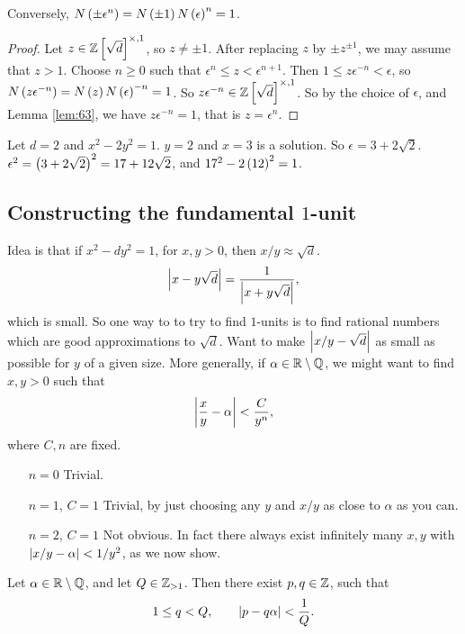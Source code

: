 Conversely, $ N\left( \pm \epsilon^n \right) = N\left( \pm 1 \right)N\left( \epsilon \right)^n = 1 $.

\begin{proof}
Let $ z \in \mathbb{Z}\left[ \sqrt{d} \right]^{\times, 1} $, so $ z \ne \pm 1 $. After replacing $ z $ by $ \pm z^{\pm 1} $, we may assume that $ z > 1 $. Choose $ n \ge 0 $ such that $ \epsilon^n \le z < \epsilon^{n + 1} $. Then $ 1 \le z\epsilon^{-n} < \epsilon $, so $ N\left( z\epsilon^{-n} \right) = N\left( z \right)N\left( \epsilon \right)^{-n} = 1 $. So $ z\epsilon^{-n} \in \mathbb{Z}\left[ \sqrt{d} \right]^{\times, 1} $. So by the choice of $ \epsilon $, and Lemma \ref{lem:63}, we have $ z\epsilon^{-n} = 1 $, that is $ z = \epsilon^n $.
\end{proof}

\begin{example*}
Let $ d = 2 $ and $ x^2 - 2y^2 = 1 $. $ y = 2 $ and $ x = 3 $ is a solution. So $ \epsilon = 3 + 2\sqrt{2} $. $ \epsilon^2 = \left( 3 + 2\sqrt{2} \right)^2 = 17 + 12\sqrt{2} $, and $ 17^2 - 2\left( 12 \right)^2  = 1 $.
\end{example*}

\subsection{Constructing the fundamental $ 1 $-unit}

Idea is that if $ x^2 - dy^2 = 1 $, for $ x, y > 0 $, then $ x / y \approx \sqrt{d} $.
$$ \left\lvert x - y\sqrt{d} \right\rvert = \dfrac{1}{\left\lvert x + y\sqrt{d} \right\rvert}, $$
which is small. So one way to to try to find $ 1 $-units is to find rational numbers which are good approximations to $ \sqrt{d} $. Want to make $ \left\lvert x / y - \sqrt{d} \right\rvert $ as small as possible for $ y $ of a given size. More generally, if $ \alpha \in \mathbb{R} \setminus \mathbb{Q} $, we might want to find $ x, y > 0 $ such that
$$ \left\lvert \dfrac{x}{y} - \alpha \right\rvert < \dfrac{C}{y^n}, $$
where $ C, n $ are fixed.
\begin{itemize}[leftmargin=1in]
\item[$ n = 0 $] Trivial.
\item[$ n = 1 $, $ C = 1 $] Trivial, by just choosing any $ y $ and $ x / y $ as close to $ \alpha $ as you can.
\item[$ n = 2 $, $ C = 1 $] Not obvious. In fact there always exist infinitely many $ x, y $ with $ \left\lvert x / y - \alpha \right\rvert < 1 / y^2 $, as we now show.
\end{itemize}

\begin{theorem}
\label{thm:65}
Let $ \alpha \in \mathbb{R} \setminus \mathbb{Q} $, and let $ Q \in \mathbb{Z}_{> 1} $. Then there exist $ p, q \in \mathbb{Z} $, such that
$$ 1 \le q < Q, \qquad \left\lvert p - q\alpha \right\rvert < \dfrac{1}{Q}. $$
\end{theorem}

